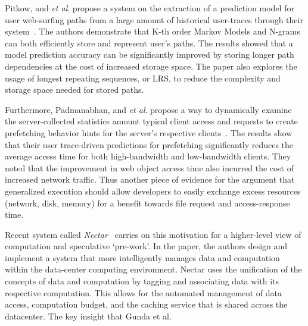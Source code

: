 Pitkow, and {\it et al}. propose a system on the extraction of a prediction
model for user web-surfing paths from a large amount of historical user-traces
through their system~\cite{pitkow}. The authors demonstrate that K-th order
Markov Models and N-grams can both efficiently store and represent user's paths.
The results showed that a model prediction accuracy can be significantly
improved by storing longer path dependencies at the cost of increased storage
space. The paper also explores the usage of longest repeating sequences, or
LRS, to reduce the complexity and storage space needed for stored paths.

Furthermore, Padmanabhan, and {\it et al}. propose a way to dynamically examine
the server-collected statistics amount typical client access and
requests to create prefetching behavior hints for the server's respective
clients~\cite{padmanabhan}.  The results show that their user trace-driven
predictions for prefetching significantly reduces the average access time for
both high-bandwidth and low-bandwidth clients. They noted that the improvement
in web object access time also incurred the cost of increased network traffic.
Thus another piece of evidence for the argument that generalized execution
should allow developers to easily exchange excess resources (network, disk,
memory) for a benefit towards file request and access-response time.

Recent system called {\it Nectar}~\cite{nectar} carries on this motivation for a
higher-level view of computation and speculative `pre-work'. In the paper, the
authors design and implement a system that more intelligently manages data and
computation within the data-center computing environment. Nectar uses the
unification of the concepts of data and computation by tagging and associating
data with its respective computation. This allows for the automated management
of data access, computation budget, and the caching service that is shared
across the datacenter.  The key insight that Gunda et al. 
